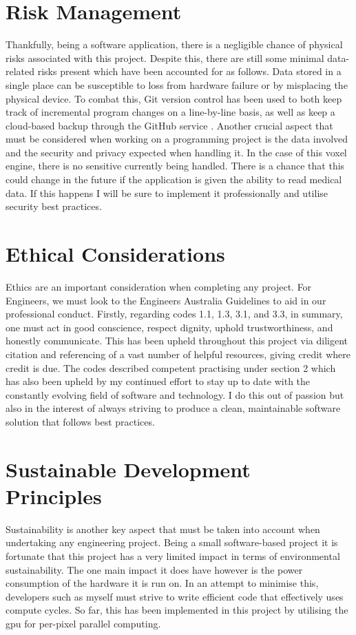\documentclass[titlepage]{article}
\begin{document}
\section{Risk Management}
Thankfully, being a software application, there is a negligible chance of physical risks associated with this project. Despite this, there are still some minimal data-related risks present which have been accounted for as follows. Data stored in a single place can be susceptible to loss from hardware failure or by misplacing the physical device. To combat this, Git version control has been used to both keep track of incremental program changes on a line-by-line basis, as well as keep a cloud-based backup through the GitHub service \cite{github}. Another crucial aspect that must be considered when working on a programming project is the data involved and the security and privacy expected when handling it. In the case of this voxel engine, there is no sensitive currently being handled. There is a chance that this could change in the future if the application is given the ability to read medical data. If this happens I will be sure to implement it professionally and utilise security best practices.

\section{Ethical Considerations}
Ethics are an important consideration when completing any project. For Engineers, we must look to the Engineers Australia Guidelines \cite{ethics} to aid in our professional conduct. Firstly, regarding codes 1.1, 1.3, 3.1, and 3.3, in summary, one must act in good conscience, respect dignity, uphold trustworthiness, and honestly communicate. This has been upheld throughout this project via diligent citation and referencing of a vast number of helpful resources, giving credit where credit is due. The codes described competent practising under section 2 which has also been upheld by my continued effort to stay up to date with the constantly evolving field of software and technology. I do this out of passion but also in the interest of always striving to produce a clean, maintainable software solution that follows best practices.

\section{Sustainable Development Principles}
Sustainability is another key aspect that must be taken into account when undertaking any engineering project. Being a small software-based project it is fortunate that this project has a very limited impact in terms of environmental sustainability. The one main impact it does have however is the power consumption of the hardware it is run on. In an attempt to minimise this, developers such as myself must strive to write efficient code that effectively uses compute cycles. So far, this has been implemented in this project by utilising the \acrshort{gpu} for per-pixel parallel computing.
\end{document}

